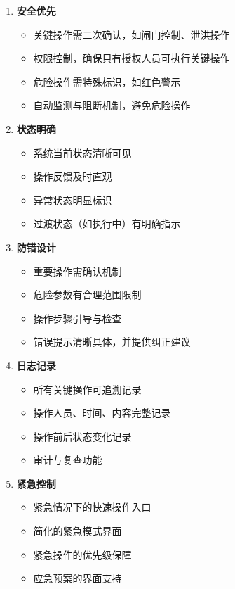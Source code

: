 \begin{enumerate}
\def\labelenumi{\arabic{enumi}.}
\tightlist
\item
  \textbf{安全优先}

  \begin{itemize}
  \tightlist
  \item
    关键操作需二次确认，如闸门控制、泄洪操作
  \item
    权限控制，确保只有授权人员可执行关键操作
  \item
    危险操作需特殊标识，如红色警示
  \item
    自动监测与阻断机制，避免危险操作
  \end{itemize}
\item
  \textbf{状态明确}

  \begin{itemize}
  \tightlist
  \item
    系统当前状态清晰可见
  \item
    操作反馈及时直观
  \item
    异常状态明显标识
  \item
    过渡状态（如执行中）有明确指示
  \end{itemize}
\item
  \textbf{防错设计}

  \begin{itemize}
  \tightlist
  \item
    重要操作需确认机制
  \item
    危险参数有合理范围限制
  \item
    操作步骤引导与检查
  \item
    错误提示清晰具体，并提供纠正建议
  \end{itemize}
\item
  \textbf{日志记录}

  \begin{itemize}
  \tightlist
  \item
    所有关键操作可追溯记录
  \item
    操作人员、时间、内容完整记录
  \item
    操作前后状态变化记录
  \item
    审计与复查功能
  \end{itemize}
\item
  \textbf{紧急控制}

  \begin{itemize}
  \tightlist
  \item
    紧急情况下的快速操作入口
  \item
    简化的紧急模式界面
  \item
    紧急操作的优先级保障
  \item
    应急预案的界面支持
  \end{itemize}
\end{enumerate}

